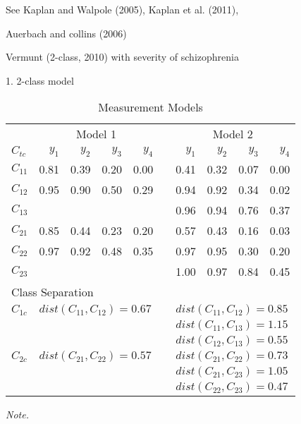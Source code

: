 \documentclass[man, noextraspace, floatsintext, 12pt]{apa7}
\begin{document}
See Kaplan and Walpole (2005), Kaplan et al. (2011), 

Auerbach and collins (2006)

Vermunt (2-class, 2010) with severity of schizophrenia

1. 2-class model

\begin{table}[!htp]
\centering
\begin{threeparttable}
\caption{Measurement Models}
\label{tb:meas}
\begin{tabular}{l rrrr r rrrr}
\toprule
& \multicolumn{4}{c}{Model 1}& & \multicolumn{4}{c}{Model 2}\\ \cmidrule(lr){2-5} \cmidrule(lr){7-10} 
$C_{tc}$ & $y_1$ & $y_2$ & $y_3$ & $y_4$ & & $y_1$ & $y_2$ & $y_3$ & $y_4$\\ \midrule
$C_{11}$ & 0.81 & 0.39 & 0.20 & 0.00 & & 0.41 & 0.32 & 0.07 & 0.00 \\
$C_{12}$ & 0.95 & 0.90 & 0.50 & 0.29 & & 0.94 & 0.92 & 0.34 & 0.02 \\
$C_{13}$ &  	 &      &      &      & & 0.96 & 0.94 & 0.76 & 0.37 \\
$C_{21}$ & 0.85 & 0.44 & 0.23 & 0.20 & & 0.57 & 0.43 & 0.16 & 0.03 \\
$C_{22}$ & 0.97 & 0.92 & 0.48 & 0.35 & & 0.97 & 0.95 & 0.30 & 0.20 \\
$C_{23}$ & 	 & 		& 	   & 	  & & 1.00 & 0.97 & 0.84 & 0.45 \\ \midrule
\multicolumn{10}{l}{Class Separation}\\
$C_{1c}$ & \multicolumn{4}{l}{$dist(C_{11}, C_{12})=0.67$} & & \multicolumn{4}{l}{$dist(C_{11}, C_{12})=0.85$}\\
 &  	 &      &      &      & & \multicolumn{4}{l}{$dist(C_{11}, C_{13})=1.15$}\\
 &  	 &      &      &      & & \multicolumn{4}{l}{$dist(C_{12}, C_{13})=0.55$}\\
$C_{2c}$& \multicolumn{4}{l}{$dist(C_{21}, C_{22})=0.57$} & & \multicolumn{4}{l}{$dist(C_{21}, C_{22})=0.73$}\\
 &  	 &      &      &      & & \multicolumn{4}{l}{$dist(C_{21}, C_{23})=1.05$}\\
 &  	 &      &      &      & & \multicolumn{4}{l}{$dist(C_{22}, C_{23})=0.47$}\\
 	 \bottomrule
\end{tabular}
 \vspace*{1mm}
 	\begin{tablenotes}
    {\small
        \textit{Note.} 
    }
 	\end{tablenotes}
 \end{threeparttable}
\end{table}
\end{document}
